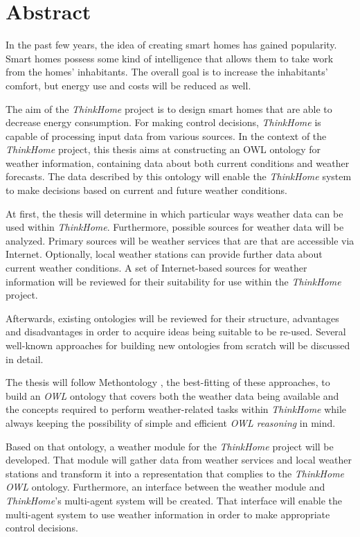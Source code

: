 \chapter*{Abstract}

In the past few years, the idea of creating smart homes has gained popularity.
Smart homes possess some kind of intelligence that allows them to take work from the homes' inhabitants.
The overall goal is to increase the inhabitants' comfort, but energy use and costs will be reduced as well.

The aim of the \textit{ThinkHome} project \cite{CR2011-TH_Journal} \cite{CR2010-DEST_ThinkHome} is to design smart homes that are able to decrease energy consumption.
For making control decisions, \textit{ThinkHome} is capable of processing input data from various sources.
In the context of the \textit{ThinkHome} project, this thesis aims at constructing an OWL ontology for weather information, containing data about both current conditions and weather forecasts.
The data described by this ontology will enable the \textit{ThinkHome} system to make decisions based on current and future weather conditions.

At first, the thesis will determine in which particular ways weather data can be used within \textit{ThinkHome}. Furthermore, possible sources for weather data will be analyzed. Primary sources will be weather services that are that are accessible via Internet. Optionally, local weather stations can provide further data about current weather conditions. A set of Internet-based sources for weather information will be reviewed for their suitability for use within the \textit{ThinkHome} project.

Afterwards, existing ontologies will be reviewed for their structure, advantages and disadvantages in order to acquire ideas being suitable to be re-used. Several well-known approaches for building new ontologies from scratch will be discussed in detail.

The thesis will follow Methontology \cite{Methontology}, the best-fitting of these approaches, to build an \textit{OWL} ontology that covers both the weather data being available and the concepts required to perform weather-related tasks within \textit{ThinkHome} while always keeping the possibility of simple and efficient \textit{OWL reasoning} in mind.

Based on that ontology, a weather module for the \textit{ThinkHome} project will be developed. That module will gather data from weather services and local weather stations and transform it into a representation that complies to the \textit{ThinkHome} \textit{OWL} ontology. Furthermore, an interface between the weather module and \textit{ThinkHome}'s multi-agent system will be created. That interface will enable the multi-agent system to use weather information in order to make appropriate control decisions.
